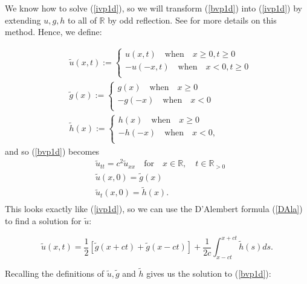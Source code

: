 \documentclass[a4paper, 12pt]{article}
\numberwithin{equation}{section}
\begin{document}
We know how to solve (\ref{ivp1d}), so we will transform (\ref{bvp1d}) into (\ref{ivp1d})
by extending $u,g,h$ to all of $\mathbb{R}$ by odd reflection. See \cite[Ch. 2.4.1]{Ev} for
more details on this method. Hence, we define:

\begin{equation*}
    \begin{aligned}
        &\tilde{u}(x,t):=
        \begin{cases}
            u(x,t) \quad \textrm{when} \quad x \ge 0, t \ge 0\\
            -u(-x,t) \quad \textrm{when} \quad x<0, t \ge 0\\
        \end{cases}
        \\
        &\tilde{g}(x):=
        \begin{cases}
            g(x) \quad \textrm{when} \quad x \ge 0\\
            -g(-x) \quad \textrm{when} \quad x<0\\
        \end{cases}
        \\
        &\tilde{h}(x):=
        \begin{cases}
            h(x) \quad \textrm{when} \quad x \ge 0\\
            -h(-x) \quad \textrm{when} \quad x<0,\\
        \end{cases}
    \end{aligned}
\end{equation*}
and so (\ref{bvp1d}) becomes 
\begin{align*}
    &\tilde{u}_{tt}=c^2\tilde{u}_{xx} \quad \textrm {for} \quad x \in \mathbb{R}, \quad t \in \mathbb{R}_{>0} \\
    &\tilde{u}(x,0)=\tilde{g}(x)\\
    &\tilde{u}_t(x,0)=\tilde{h}(x).\\
\end{align*}
This looks exactly like (\ref{ivp1d}), so we can use the D'Alembert formula
(\ref{DAla}) to find a solution for $\tilde{u}$:

\begin{equation*}
    \tilde{u}(x,t)=\frac{1}{2}\left[\tilde{g}(x+ct)+\tilde{g}(x-ct)\right]+\frac{1}{2c}\int^{x+ct}_{x-ct}\tilde{h}(s)ds.
\end{equation*}

Recalling the definitions of $\tilde{u}, \tilde{g}$ and $\tilde{h}$ gives us the
solution to (\ref{bvp1d}):
\end{document}
